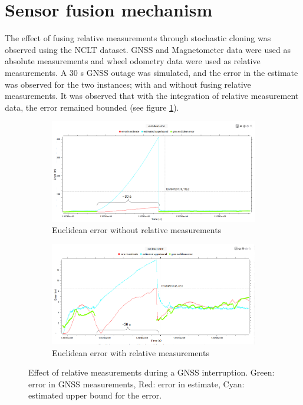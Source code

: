 \section{Sensor fusion mechanism}
The effect of fusing relative measurements through stochastic cloning was observed using the \gls{NCLT} dataset. \gls{GNSS} and Magnetometer data were used as absolute measurements and wheel odometry data were used as relative measurements. A 30 s \gls{GNSS} outage was simulated, and the error in the estimate was observed for the two instances; with and without fusing relative measurements. It was observed that with the integration of relative measurement data, the error remained bounded (see figure \ref{fig:pa:relativeMeasurements}).
\begin{figure}[h]
	\centering
    \begin{subfigure}{\textwidth}
        \includegraphics[width=\textwidth]{figs/euclidean-error-wo-rm.png}
        \caption{Euclidean error without relative measurements}
    \end{subfigure}
    \begin{subfigure}{\textwidth}
        \includegraphics[width=\textwidth]{figs/euclidean-error-with-rm.png}
        \caption{Euclidean error with relative measurements}
    \end{subfigure}
    \caption[Effect of relative measurements]{Effect of relative measurements during a \gls{GNSS} interruption. Green: error in \gls{GNSS} measurements, Red: error in estimate, Cyan: estimated upper bound for the error.}
    \label{fig:pa:relativeMeasurements}
\end{figure}

